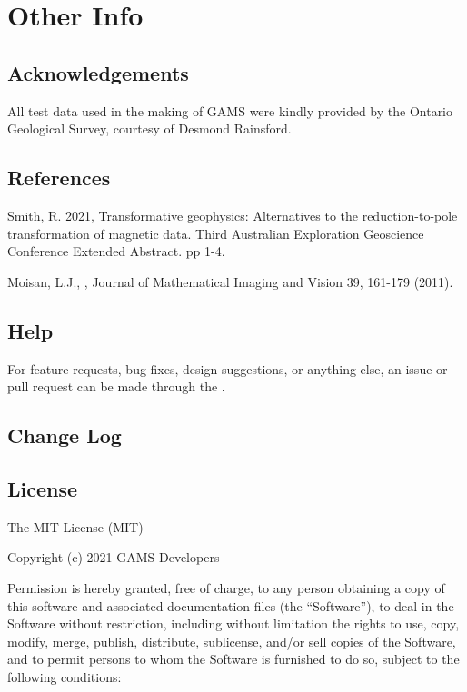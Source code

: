 \documentclass[letterpaper,10pt,english,openany,oneside]{sphinxmanual}
\begin{document}
\chapter{Other Info}
\label{\detokenize{index:other-info}}

\section{Acknowledgements}
\label{\detokenize{index:acknowledgements}}
All test data used in the making of GAMS were kindly provided by the Ontario Geological Survey, courtesy of Desmond Rainsford.


\section{References}
\label{\detokenize{index:references}}
Smith, R. 2021, Transformative geophysics: Alternatives to the reduction-to-pole transformation of magnetic data. Third Australian Exploration Geoscience Conference Extended Abstract. pp 1-4.

Moisan, L.J., , Journal of Mathematical Imaging and Vision 39, 161-179 (2011). 


\section{Help}
\label{\detokenize{index:help}}
For feature requests, bug fixes, design suggestions, or anything else, an issue or pull request can be made through the .


\section{Change Log}
\label{\detokenize{index:change-log}}
\newpage


\section{License}
\label{\detokenize{index:license}}
The MIT License (MIT)

Copyright (c) 2021 GAMS Developers

Permission is hereby granted, free of charge, to any person obtaining a copy of
this software and associated documentation files (the “Software”), to deal in
the Software without restriction, including without limitation the rights to
use, copy, modify, merge, publish, distribute, sublicense, and/or sell copies of
the Software, and to permit persons to whom the Software is furnished to do so,
subject to the following conditions:
\end{document}
